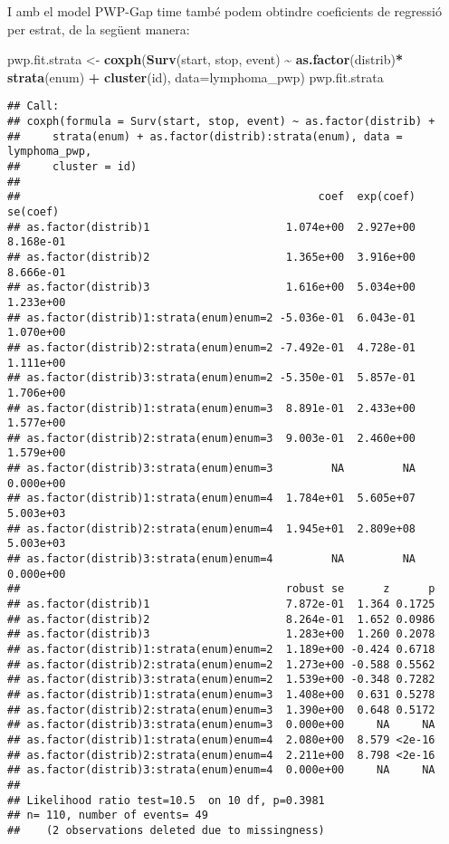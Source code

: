 \documentclass[
]{article}
\newenvironment{Shaded}{\begin{snugshade}}{\end{snugshade}}
\newcommand{\AttributeTok}[1]{\textcolor[rgb]{0.13,0.29,0.53}{#1}}
\newcommand{\FunctionTok}[1]{\textcolor[rgb]{0.13,0.29,0.53}{\textbf{#1}}}
\newcommand{\NormalTok}[1]{#1}
\newcommand{\OtherTok}[1]{\textcolor[rgb]{0.56,0.35,0.01}{#1}}
\newcommand{\SpecialCharTok}[1]{\textcolor[rgb]{0.81,0.36,0.00}{\textbf{#1}}}
\begin{document}
I amb el model PWP-Gap time també podem obtindre coeficients de
regressió per estrat, de la següent manera:

\begin{Shaded}
\begin{Highlighting}[]
\NormalTok{pwp.fit.strata }\OtherTok{\textless{}{-}} \FunctionTok{coxph}\NormalTok{(}\FunctionTok{Surv}\NormalTok{(start, stop, event) }\SpecialCharTok{\textasciitilde{}} \FunctionTok{as.factor}\NormalTok{(distrib)}\SpecialCharTok{*} \FunctionTok{strata}\NormalTok{(enum) }\SpecialCharTok{+}
                  \FunctionTok{cluster}\NormalTok{(id), }\AttributeTok{data=}\NormalTok{lymphoma\_pwp)}
\NormalTok{pwp.fit.strata}
\end{Highlighting}
\end{Shaded}

\begin{verbatim}
## Call:
## coxph(formula = Surv(start, stop, event) ~ as.factor(distrib) + 
##     strata(enum) + as.factor(distrib):strata(enum), data = lymphoma_pwp, 
##     cluster = id)
## 
##                                              coef  exp(coef)   se(coef)
## as.factor(distrib)1                     1.074e+00  2.927e+00  8.168e-01
## as.factor(distrib)2                     1.365e+00  3.916e+00  8.666e-01
## as.factor(distrib)3                     1.616e+00  5.034e+00  1.233e+00
## as.factor(distrib)1:strata(enum)enum=2 -5.036e-01  6.043e-01  1.070e+00
## as.factor(distrib)2:strata(enum)enum=2 -7.492e-01  4.728e-01  1.111e+00
## as.factor(distrib)3:strata(enum)enum=2 -5.350e-01  5.857e-01  1.706e+00
## as.factor(distrib)1:strata(enum)enum=3  8.891e-01  2.433e+00  1.577e+00
## as.factor(distrib)2:strata(enum)enum=3  9.003e-01  2.460e+00  1.579e+00
## as.factor(distrib)3:strata(enum)enum=3         NA         NA  0.000e+00
## as.factor(distrib)1:strata(enum)enum=4  1.784e+01  5.605e+07  5.003e+03
## as.factor(distrib)2:strata(enum)enum=4  1.945e+01  2.809e+08  5.003e+03
## as.factor(distrib)3:strata(enum)enum=4         NA         NA  0.000e+00
##                                         robust se      z      p
## as.factor(distrib)1                     7.872e-01  1.364 0.1725
## as.factor(distrib)2                     8.264e-01  1.652 0.0986
## as.factor(distrib)3                     1.283e+00  1.260 0.2078
## as.factor(distrib)1:strata(enum)enum=2  1.189e+00 -0.424 0.6718
## as.factor(distrib)2:strata(enum)enum=2  1.273e+00 -0.588 0.5562
## as.factor(distrib)3:strata(enum)enum=2  1.539e+00 -0.348 0.7282
## as.factor(distrib)1:strata(enum)enum=3  1.408e+00  0.631 0.5278
## as.factor(distrib)2:strata(enum)enum=3  1.390e+00  0.648 0.5172
## as.factor(distrib)3:strata(enum)enum=3  0.000e+00     NA     NA
## as.factor(distrib)1:strata(enum)enum=4  2.080e+00  8.579 <2e-16
## as.factor(distrib)2:strata(enum)enum=4  2.211e+00  8.798 <2e-16
## as.factor(distrib)3:strata(enum)enum=4  0.000e+00     NA     NA
## 
## Likelihood ratio test=10.5  on 10 df, p=0.3981
## n= 110, number of events= 49 
##    (2 observations deleted due to missingness)
\end{verbatim}
\end{document}
